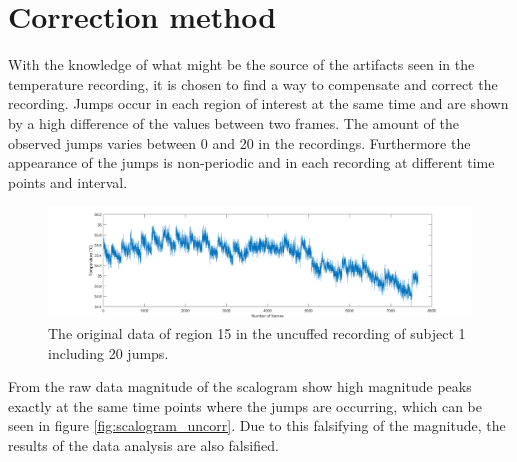 \section{Correction method}
\label{sec:correction_method}
With the knowledge of what might be the source of the artifacts seen in the temperature recording, it is chosen to find a way to compensate and correct the recording.
Jumps occur in each region of interest at the same time and are shown by a high difference of the values between two frames. The amount of the observed jumps varies between 0 and 20 in the recordings. Furthermore the appearance of the jumps is non-periodic and in each recording at different time points and interval.
\begin{figure}[H]
	\includegraphics[width=1\textwidth]{figures/raw15}
	\caption{The original data of region 15 in the uncuffed recording of subject 1 including 20 jumps.}
	\label{fig:raw15}
\end{figure}
From the raw data magnitude of the scalogram show high magnitude peaks exactly at the same time points where the jumps are occurring, which can be seen in figure \ref{fig:scalogram_uncorr}. Due to this falsifying of the magnitude, the results of the data analysis are also falsified.

